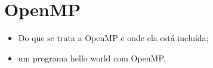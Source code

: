 \section{OpenMP}

	\begin{itemize}
		\item Do que se trata a OpenMP e onde ela está incluída;
		\item um programa hello world com OpenMP.
	\end{itemize}